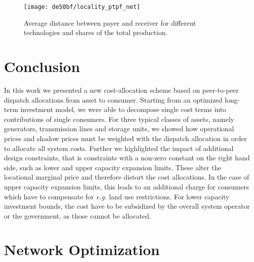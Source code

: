 \documentclass[11pt,twocolumn]{article}
\newcommand{\eg}{\textit{e.g.} }
\begin{document}
\begin{figure}
    \centering
    \texttt{[image: de50bf/locality\_ptpf\_net]}
    \caption{Average distance between payer and receiver for different technologies and shares of the total production.}
    \label{fig:locality}
\end{figure}


\section{Conclusion}

In this work we presented a new cost-allocation scheme based on peer-to-peer dispatch allocations from asset to consumer. Starting from an optimized long-term investment model, we were able to decompose single cost terms into contributions of single consumers. For three typical classes of assets, namely generators, transmission lines and storage units, we showed how operational prices and shadow prices must be weighted with the dispatch allocation in order to allocate all system costs. Further we highlighted the impact of additional design constraints, that is constraints with a non-zero constant on the right hand side, such as lower and upper capacity expansion limits. These alter the locational marginal price and therefore distort the cost allocations. In the case of upper capacity expansion limits, this leads to an additional charge for consumers which have to compensate for \eg land use restrictions. For lower capacity investment bounds, the cost have to be subsidized by the overall system operator or the government, as those cannot be allocated.

\clearpage
\appendix

\section{Network Optimization}

\renewcommand\theequation{\thesection.\arabic{equation}}
\setcounter{equation}{0}

\renewcommand\thefigure{\thesection.\arabic{figure}}    
\setcounter{figure}{0}    
\end{document}
